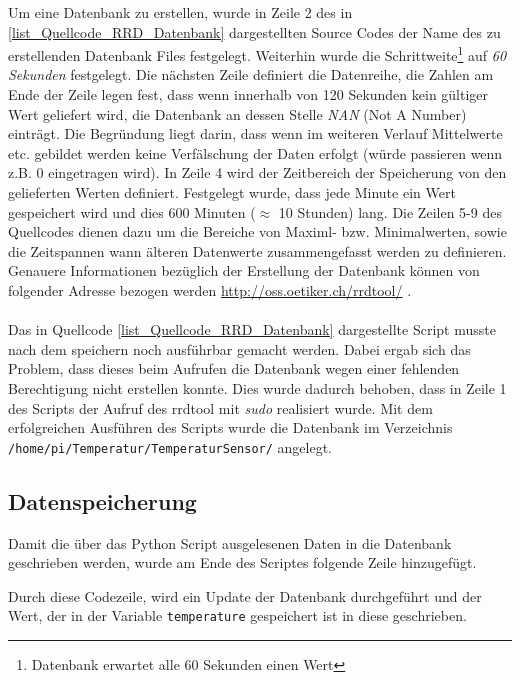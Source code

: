 Um eine Datenbank zu erstellen, wurde in Zeile 2 des in \ref{list_Quellcode_RRD_Datenbank} dargestellten Source Codes der Name des zu erstellenden Datenbank Files festgelegt. Weiterhin wurde die Schrittweite\footnote{Datenbank erwartet alle 60 Sekunden einen Wert} auf \textit{60 Sekunden} festgelegt. Die nächsten Zeile definiert die Datenreihe, die Zahlen am Ende der Zeile legen fest, dass wenn innerhalb von 120 Sekunden kein gültiger Wert geliefert wird, die Datenbank an dessen Stelle \textit{NAN} (Not A Number) einträgt. Die Begründung liegt darin, dass wenn im weiteren Verlauf Mittelwerte etc. gebildet werden keine Verfälschung der Daten erfolgt (würde passieren wenn z.B. 0 eingetragen wird). In Zeile 4 wird der Zeitbereich der Speicherung von den gelieferten Werten definiert. Festgelegt wurde, dass jede Minute ein Wert gespeichert wird und dies 600 Minuten ($\approx$ 10 Stunden) lang.  Die Zeilen 5-9 des Quellcodes dienen dazu um die Bereiche von Maximl- bzw. Minimalwerten, sowie die Zeitspannen wann älteren Datenwerte zusammengefasst werden zu definieren. Genauere Informationen bezüglich der Erstellung der Datenbank können von folgender Adresse bezogen werden \url{http://oss.oetiker.ch/rrdtool/} \citep{Hompage_RRDtool}.\\\\
Das in Quellcode \ref{list_Quellcode_RRD_Datenbank} dargestellte Script musste nach dem speichern noch ausführbar gemacht werden. Dabei ergab sich das Problem, dass dieses beim Aufrufen die Datenbank wegen einer fehlenden Berechtigung nicht erstellen konnte. Dies wurde dadurch behoben, dass in Zeile 1 des Scripts der Aufruf des rrdtool mit \textit{sudo} realisiert wurde. Mit dem erfolgreichen Ausführen des Scripts wurde die Datenbank im Verzeichnis \texttt{/home/pi/Temperatur/TemperaturSensor/} angelegt.

\subsection*{Datenspeicherung}
\label{subsection_Speicherung der Daten des DS18S20}
Damit die über das Python Script ausgelesenen Daten in die Datenbank geschrieben werden, wurde am Ende des Scriptes folgende Zeile hinzugefügt.



Durch diese Codezeile, wird ein Update der Datenbank durchgeführt und der Wert, der in der Variable \texttt{temperature} gespeichert ist in diese geschrieben.
\newpage

